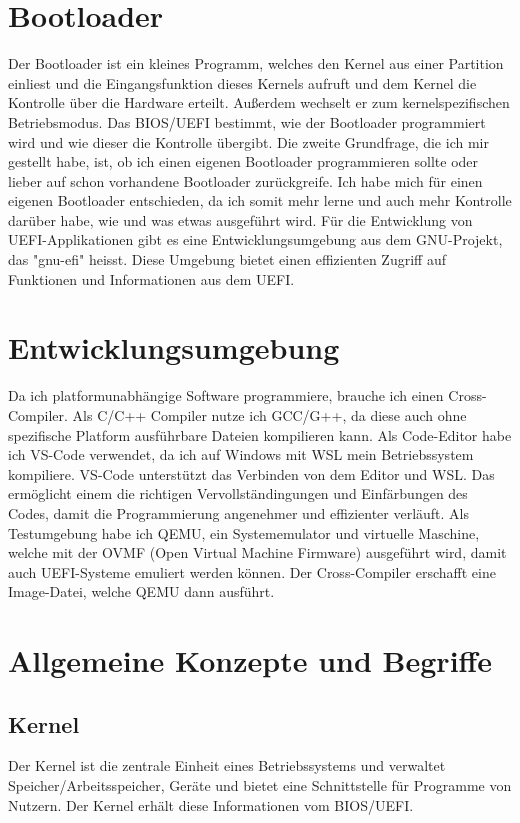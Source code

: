 \documentclass[12pt]{article}
\begin{document}
	\newpage
	
	\section{Bootloader}
	Der Bootloader\cite{bootloader} ist ein kleines Programm, welches den Kernel\cite{kernel} aus einer Partition einliest und die Eingangsfunktion dieses Kernels\cite{kernel} aufruft und dem Kernel\cite{kernel} die Kontrolle über die Hardware erteilt. Außerdem wechselt er zum kernelspezifischen Betriebsmodus. Das BIOS/UEFI\cite{uefi} bestimmt, wie der Bootloader\cite{bootloader} programmiert wird und wie dieser die Kontrolle übergibt.
	Die zweite Grundfrage, die ich mir gestellt habe, ist, ob ich einen eigenen Bootloader\cite{bootloader} programmieren sollte oder lieber auf schon vorhandene Bootloader\cite{bootloader} zurückgreife. Ich habe mich für einen eigenen Bootloader\cite{bootloader} entschieden, da ich somit mehr lerne und auch mehr Kontrolle darüber habe, wie und was etwas ausgeführt wird. Für die Entwicklung von UEFI\cite{uefi}-Applikationen gibt es eine Entwicklungsumgebung aus dem GNU-Projekt, das "gnu-efi" heisst. Diese Umgebung bietet einen effizienten Zugriff auf Funktionen und Informationen aus dem UEFI\cite{uefi}.
	
	\section{Entwicklungsumgebung}
	Da ich platformunabhängige Software programmiere, brauche ich einen Cross-Compiler. Als C/C++ Compiler nutze ich GCC/G++, da diese auch ohne spezifische Platform ausführbare Dateien kompilieren kann. Als Code-Editor habe ich VS-Code verwendet, da ich auf Windows mit WSL mein Betriebssystem kompiliere. VS-Code unterstützt das Verbinden von dem Editor und WSL. Das ermöglicht einem die richtigen Vervollständingungen und Einfärbungen des Codes, damit die Programmierung angenehmer und effizienter verläuft. Als Testumgebung habe ich QEMU, ein Systememulator und virtuelle Maschine, welche mit der OVMF (Open Virtual Machine Firmware) ausgeführt wird, damit auch UEFI\cite{uefi}-Systeme emuliert werden können. Der Cross-Compiler erschafft eine Image-Datei, welche QEMU dann ausführt. 
	
	\newpage
	
	\section{Allgemeine Konzepte und Begriffe}
	\subsection{Kernel}
	Der Kernel\cite{kernel} ist die zentrale Einheit eines Betriebssystems und verwaltet Speicher/Arbeitsspeicher, Geräte und bietet eine Schnittstelle für Programme von Nutzern. Der Kernel\cite{kernel} erhält diese Informationen vom BIOS/UEFI\cite{uefi}.
\end{document}
